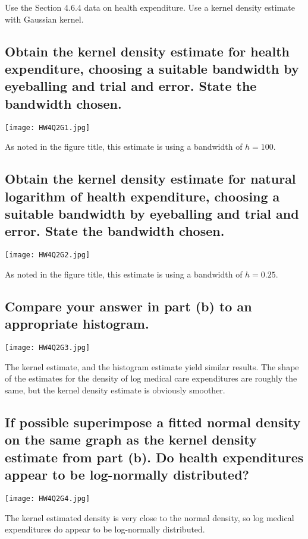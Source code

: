 \documentclass[11pt]{article}
\theoremstyle{definition}
\begin{document}
Use the Section 4.6.4 data on health expenditure. Use a kernel density estimate with Gaussian kernel.

\subsection{Obtain the kernel density estimate for health expenditure, choosing a suitable bandwidth by eyeballing and trial and error.  State the bandwidth chosen.}

\begin{center}
\texttt{[image: HW4Q2G1.jpg]}
\end{center}
As noted in the figure title, this estimate is using a bandwidth of $h=100$. 

\subsection{Obtain the kernel density estimate for natural logarithm of health expenditure, choosing a suitable bandwidth by eyeballing and trial and error. State the bandwidth chosen.}

\begin{center}
\texttt{[image: HW4Q2G2.jpg]}
\end{center}
As noted in the figure title, this estimate is using a bandwidth of $h=0.25$.

\subsection{Compare your answer in part (b) to an appropriate histogram.}

\begin{center}
\texttt{[image: HW4Q2G3.jpg]}
\end{center}
The kernel estimate, and the histogram estimate yield similar results.  The shape of the estimates for the density of log medical care expenditures are roughly the same, but the kernel density estimate is obviously smoother.  

\subsection{If possible superimpose a fitted normal density on the same graph as the kernel density estimate from part (b).  Do health expenditures appear to be log-normally distributed?}

\begin{center}
\texttt{[image: HW4Q2G4.jpg]}
\end{center}
The kernel estimated density is very close to the normal density, so log medical expenditures do appear to be log-normally distributed.  
\end{document}
